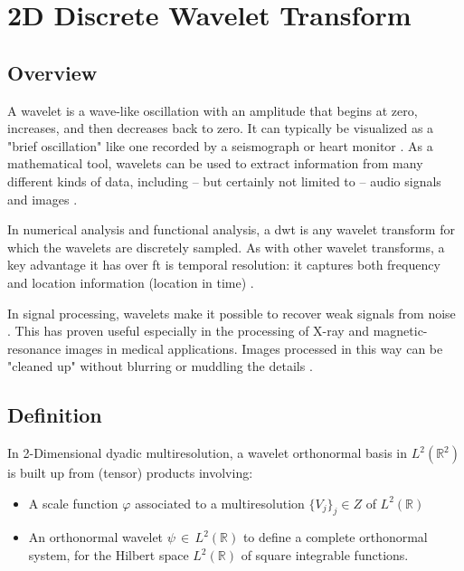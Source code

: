\section{2D Discrete Wavelet Transform}

\subsection{Overview}
A wavelet is a wave-like oscillation with an amplitude that begins at zero, increases, and then decreases back to zero. It can typically be visualized as a "brief oscillation" like one recorded by a seismograph or heart monitor \cite{lipson2010optical}. As a mathematical tool, wavelets can be used to extract information from many different kinds of data, including – but certainly not limited to – audio signals and images \cite{lovis2014ehealth}.

In numerical analysis and functional analysis, a \gls{dwt} is any wavelet transform for which the wavelets are discretely sampled. As with other wavelet transforms, a key advantage it has over \gls{ft} is temporal resolution: it captures both frequency and location information (location in time) \cite{yan2014machinery}.


In signal processing, wavelets make it possible to recover weak signals from noise . This has proven useful especially in the processing of X-ray and magnetic-resonance images in medical applications. Images processed in this way can be "cleaned up" without blurring or muddling the details \cite{leewavelet}.

\subsection{Definition}
In 2-Dimensional dyadic multiresolution, a wavelet orthonormal basis in $L^2(\mathbb{R}^2)$ is built up from (tensor) products involving:

\begin{itemize}[noitemsep,nolistsep]
	\item A scale function $\varphi$ associated to a multiresolution $\{V_j\}_j\in Z$ of $L^2(\mathbb{R})$
	\item An orthonormal wavelet $\psi \,\in\, L^2(\mathbb{R})$  to define a complete
	orthonormal system, for the	Hilbert space
	\(\scriptstyle L^2\left(\mathbb{R}\right)\) of
	square integrable functions.
\end{itemize}

